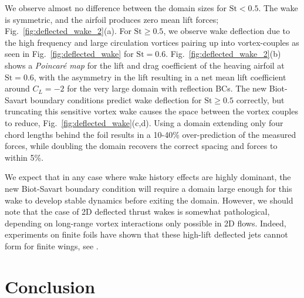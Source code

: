 \documentclass[final,1p,times]{elsarticle}
\begin{document}
We observe almost no difference between the domain sizes for $\text{St}<0.5$. The wake is symmetric, and the airfoil produces zero mean lift forces; Fig.~\ref{fig:deflected_wake_2}(a). For $\text{St}\ge 0.5$, we observe wake deflection due to the high frequency and large circulation vortices pairing up into vortex-couples as seen in Fig.~\ref{fig:deflected_wake} for $\text{St}=0.6$. Fig.~\ref{fig:deflected_wake_2}(b) shows a \emph{Poincar\'e map} for the lift and drag coefficient of the heaving airfoil at $\text{St}=0.6$, with the asymmetry in the lift resulting in a net mean lift coefficient around $C_L=-2$ for the very large domain with reflection BCs. The new Biot-Savart boundary conditions predict wake deflection for $\text{St}\ge 0.5$ correctly, but truncating this sensitive vortex wake causes the space between the vortex couples to reduce, Fig.~\ref{fig:deflected_wake}(c,d). Using a domain extending only four chord lengths behind the foil results in a 10-40\% over-prediction of the measured forces, while doubling the domain recovers the correct spacing and forces to within 5\%.

We expect that in any case where wake history effects are highly dominant, the new Biot-Savart boundary condition will require a domain large enough for this wake to develop stable dynamics before exiting the domain. However, we should note that the case of 2D deflected thrust wakes is somewhat pathological, depending on long-range vortex interactions only possible in 2D flows. Indeed, experiments on finite foils have shown that these high-lift deflected jets cannot form for finite wings, see \cite{Calderon2014OnWings, Godoy-Diana2008TransitionFoil}.
 
\section{Conclusion}
\end{document}
